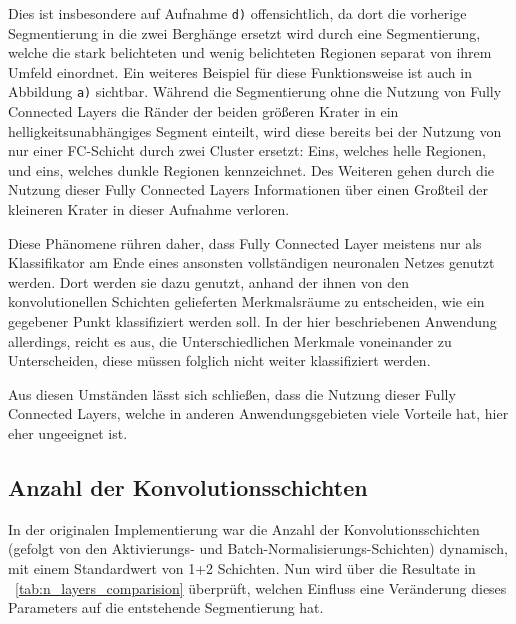 Dies ist insbesondere auf Aufnahme \texttt{d)} offensichtlich, da dort die vorherige Segmentierung in die zwei Berghänge ersetzt wird durch eine Segmentierung, welche die stark belichteten und wenig belichteten Regionen separat von ihrem Umfeld einordnet. Ein weiteres Beispiel für diese Funktionsweise ist auch in Abbildung \texttt{a)} sichtbar. Während die Segmentierung ohne die Nutzung von Fully Connected Layers die Ränder der beiden größeren Krater in ein helligkeitsunabhängiges Segment einteilt, wird diese bereits bei der Nutzung von nur einer FC-Schicht durch zwei Cluster ersetzt: Eins, welches helle Regionen, und eins, welches dunkle Regionen kennzeichnet. Des Weiteren gehen durch die Nutzung dieser Fully Connected Layers Informationen über einen Großteil der kleineren Krater in dieser Aufnahme verloren.

Diese Phänomene rühren daher, dass Fully Connected Layer meistens nur als Klassifikator am Ende eines ansonsten vollständigen neuronalen Netzes genutzt werden. Dort werden sie dazu genutzt, anhand der ihnen von den konvolutionellen Schichten gelieferten Merkmalsräume zu entscheiden, wie ein gegebener Punkt klassifiziert werden soll. In der hier beschriebenen Anwendung allerdings, reicht es aus, die Unterschiedlichen Merkmale voneinander zu Unterscheiden, diese müssen folglich nicht weiter klassifiziert werden.

Aus diesen Umständen lässt sich schließen, dass die Nutzung dieser Fully Connected Layers, welche in anderen Anwendungsgebieten viele Vorteile hat, hier eher ungeeignet ist.

\subsection{Anzahl der Konvolutionsschichten}
\label{ssec:exp_n_convolutions}

In der originalen Implementierung war die Anzahl der Konvolutionsschichten (gefolgt von den Aktivierungs- und Batch-Normalisierungs-Schichten) dynamisch, mit einem Standardwert von 1+2 Schichten. Nun wird über die Resultate in \tablename~\ref{tab:n_layers_comparision} überprüft, welchen Einfluss eine Veränderung dieses Parameters auf die entstehende Segmentierung hat.

